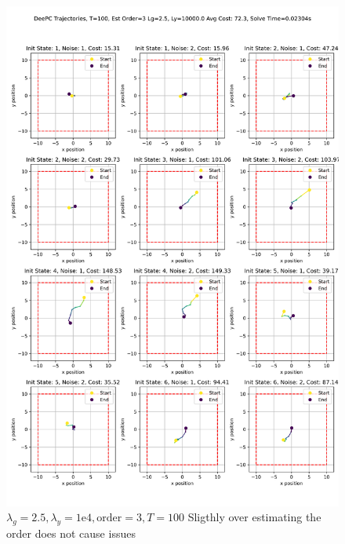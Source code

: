 \documentclass[11pt,a4paper]{article}
\begin{document}
\begin{figure}
    \centering
    \includegraphics[width=0.85\linewidth]{./figures/DeePC_trajectories_100_3_2.5_10000.0.png}
    \caption{$\lambda_g=2.5, \lambda_y=1\mathrm{e}4, \text{order}=3, T=100$ Sligthly over estimating the order does not cause issues}
    \label{fig:enter-label}
\end{figure}
\end{document}
